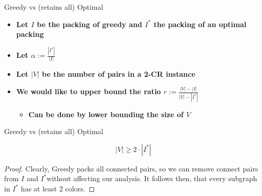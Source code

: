 \begin{frame}{Greedy vs (retains all) Optimal}
\begin{itemize}

\item \textbf<1>
{Let $I$ be the packing of greedy and $I^*$ the packing of an optimal packing}

\item \textbf<2>
{Let $\alpha := \frac{|I^*|}{|I|}$ }

\item \textbf<3>
{Let $|V|$ be the number of pairs in a 2-CR instance}

\item \textbf<4>
{We would like to upper bound the ratio $r := \frac{|V| - |I|}{|V| - |I^*|}$}

\begin{itemize}
\item \textbf<5>
{Can be done by lower bounding the size of $V$}
\end{itemize}

\end{itemize}
\end{frame}


\begin{frame}{Greedy vs (retains all) Optimal}
	
\begin{lemma}
$$ |V| \geq 2 \cdot |I^*| $$
\end{lemma}

\begin{proof}
Clearly, Greedy packs all connected pairs, so we can remove connect pairs 
from $I$ and $I^*$without affecting our analysis. 
It follows then, that every subgraph in $I^*$ has at least 2 colors. 
\end{proof}

\end{frame}

